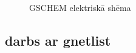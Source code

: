 \documentclass{report}
\begin{document}
\begin{figure}[h]
\caption{GSCHEM elektriskā shēma}
\label{2}
\end{figure}

\subsection{darbs ar gnetlist}

\end{document}
